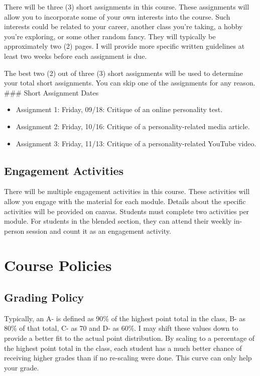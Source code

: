 \documentclass[11pt,]{article}
\begin{document}
There will be three (3) short assignments in this course. These
assignments will allow you to incorporate some of your own interests
into the course. Such interests could be related to your career, another
class you're taking, a hobby you're exploring, or some other random
fancy. They will typically be approximately two (2) pages. I will
provide more specific written guidelines at least two weeks before each
assignment is due.

The best two (2) out of three (3) short assignments will be used to
determine your total short assignments. You can skip one of the
assignments for any reason. \#\#\# Short Assignment Dates

\begin{itemize}
\item
  Assignment 1: Friday, 09/18: Critique of an online personality test.
\item
  Assignment 2: Friday, 10/16: Critique of a personality-related media
  article.
\item
  Assignment 3: Friday, 11/13: Critique of a personality-related YouTube
  video.
\end{itemize}

\hypertarget{engagement-activities}{%
\subsection{Engagement Activities}\label{engagement-activities}}

There will be multiple engagement activities in this course. These
activities will allow you engage with the material for each module.
Details about the specific activities will be provided on canvas.
Students must complete two activities per module. For students in the
blended section, they can attend their weekly in-person session and
count it as an engagement activity.

\hypertarget{course-policies}{%
\section{Course Policies}\label{course-policies}}

\hypertarget{grading-policy}{%
\subsection{Grading Policy}\label{grading-policy}}

Typically, an A- is defined as 90\% of the highest point total in the
class, B- as 80\% of that total, C- as 70 and D- as 60\%. I may shift
these values down to provide a better fit to the actual point
distribution. By scaling to a percentage of the highest point total in
the class, each student has a much better chance of receiving higher
grades than if no re-scaling were done. This curve can only help your
grade.
\end{document}
